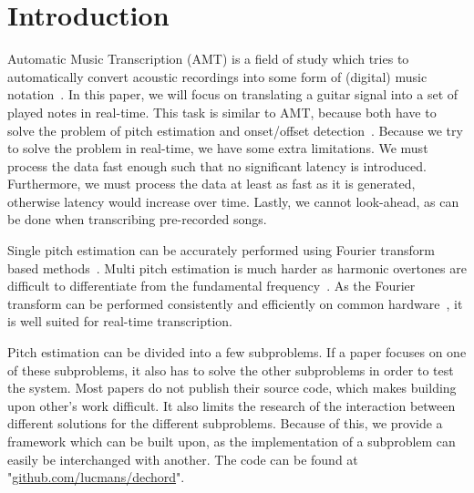 \documentclass[10pt,twocolumn]{article}
\begin{document}
\section{Introduction}
Automatic Music Transcription (AMT) is a field of study which tries to automatically convert acoustic recordings into some form of (digital) music notation~\cite{survey1}. In this paper, we will focus on translating a guitar signal into a set of played notes in real-time. This task is similar to AMT, because both have to solve the problem of pitch estimation and onset/offset detection~\cite{survey2}. Because we try to solve the problem in real-time, we have some extra limitations. We must process the data fast enough such that no significant latency is introduced. Furthermore, we must process the data at least as fast as it is generated, otherwise latency would increase over time. Lastly, we cannot look-ahead, as can be done when transcribing pre-recorded songs.

Single pitch estimation can be accurately performed using Fourier transform based methods~\cite{mono}. Multi pitch estimation is much harder as harmonic overtones are difficult to differentiate from the fundamental frequency~\cite{oud}. As the Fourier transform can be performed consistently and efficiently on common hardware~\cite{fourierspeed}, it is well suited for real-time transcription.  %

Pitch estimation can be divided into a few subproblems. If a paper focuses on one of these subproblems, it also has to solve the other subproblems in order to test the system. Most papers do not publish their source code, which makes building upon other's work difficult. It also limits the research of the interaction between different solutions for the different subproblems. Because of this, we provide a framework which can be built upon, as the implementation of a subproblem can easily be interchanged with another. The code can be found at "\url{github.com/lucmans/dechord}".
\end{document}
